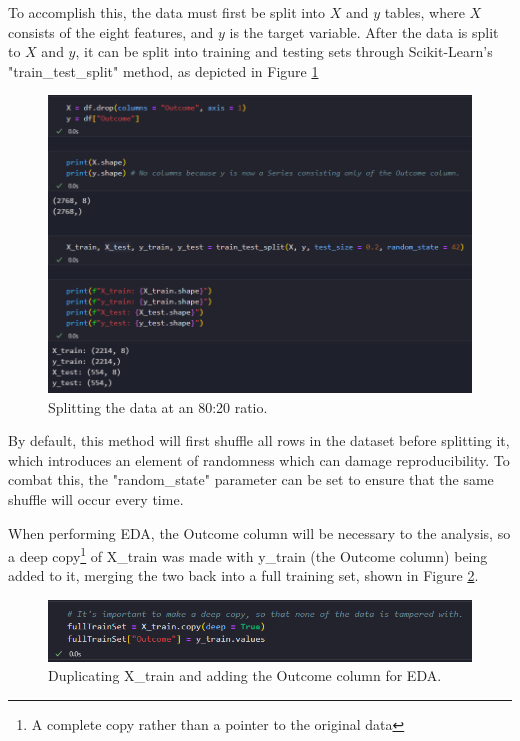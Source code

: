 \documentclass[12pt]{report}
\newcommand{\para}{\vspace{8pt}\noindent}
\begin{document}
\para To accomplish this, the data must first be split into $X$ and $y$ tables, where $X$ consists of the eight features, and $y$ is the target variable.
After the data is split to $X$ and $y$, it can be split into training and testing sets through Scikit-Learn's "train\_test\_split" method, as depicted in Figure \ref{fig:TrainTestSplit}

\begin{figure}[H]
    \centering
    \includegraphics[width=\linewidth]{EDA/TrainTestSplit.png}
    \caption{Splitting the data at an 80:20 ratio.}
    \label{fig:TrainTestSplit}
\end{figure}

\para By default, this method will first shuffle all rows in the dataset before splitting it, which introduces an element of randomness which can damage 
reproducibility. To combat this, the "random\_state" parameter can be set to ensure that the same shuffle will occur every time.

\para When performing EDA, the Outcome column will be necessary to the analysis, so a deep copy\footnote{A complete copy rather than a pointer to the original data}
of X\_train was made with y\_train (the Outcome column) being added to it, merging the two back into a full training set, shown in Figure \ref{fig:FullTrainingSet}.

\begin{figure}[H]
    \centering
    \includegraphics[width=\linewidth]{EDA/FullTrainingSet.png}
    \caption{Duplicating X\_train and adding the Outcome column for EDA.}
    \label{fig:FullTrainingSet}
\end{figure}
\end{document}
